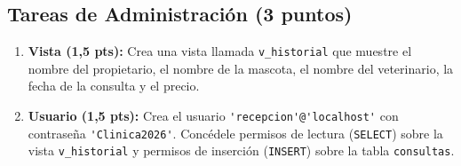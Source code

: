 \documentclass[a4paper,11pt]{article}
\begin{document}
\begin{Form}
\section{Tareas de Administración (3 puntos)}

\begin{enumerate}
    \item \textbf{Vista (1,5 pts):} Crea una vista llamada \texttt{v\_historial} que muestre el nombre del propietario, el nombre de la mascota, el nombre del veterinario, la fecha de la consulta y el precio.
    \item \textbf{Usuario (1,5 pts):} Crea el usuario \lstinline{'recepcion'@'localhost'} con contraseña \lstinline{'Clinica2026'}. Concédele permisos de lectura (\texttt{SELECT}) sobre la vista \texttt{v\_historial} y permisos de inserción (\texttt{INSERT}) sobre la tabla \texttt{consultas}.
\end{enumerate}

\end{Form}
\end{document}

